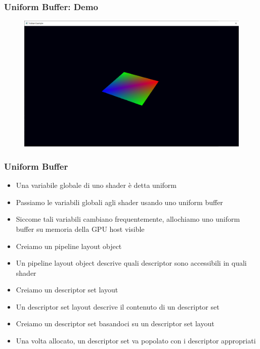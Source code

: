 \begin{frame}
\frametitle{Uniform Buffer: Demo}
\begin{figure}[ht]
    \centering
    \includegraphics[scale=0.25]{images/SlidesUniforms/RenderQuad.png}
\end{figure}
\end{frame}

\begin{frame}
\frametitle{Uniform Buffer}
\begin{itemize}
\item Una variabile globale di uno shader è detta uniform
\item Passiamo le variabili globali agli shader usando uno uniform buffer
\item Siccome tali variabili cambiano frequentemente, allochiamo uno uniform buffer su memoria della GPU host visible
\item Creiamo un pipeline layout object
\item Un pipeline layout object descrive quali descriptor sono accessibili in quali shader
\item Creiamo un descriptor set layout
\item Un descriptor set layout descrive il contenuto di un descriptor set
\item Creiamo un descriptor set basandoci su un descriptor set layout
\item Una volta allocato, un descriptor set va popolato con i descriptor appropriati
\end{itemize}
\end{frame}

